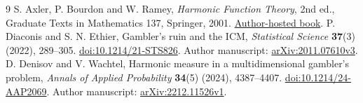 \documentclass[11pt]{article}
\begin{document}
\begin{thebibliography}{9}
S. Axler, P. Bourdon and W. Ramey,
\emph{Harmonic Function Theory}, 2nd ed., Graduate Texts in Mathematics 137,
Springer, 2001.
\href{https://www.axler.net/HFT.pdf}{Author-hosted book}.
P. Diaconis and S. N. Ethier, Gambler's ruin and the ICM,
\emph{Statistical Science} \textbf{37}(3) (2022), 289--305.
\href{https://doi.org/10.1214/21-STS826}{doi:10.1214/21-STS826}.
Author manuscript: \href{https://arxiv.org/abs/2011.07610v3}{arXiv:2011.07610v3}.
D. Denisov and V. Wachtel, Harmonic measure in a multidimensional gambler's problem,
\emph{Annals of Applied Probability} \textbf{34}(5) (2024), 4387--4407.
\href{https://doi.org/10.1214/24-AAP2069}{doi:10.1214/24-AAP2069}.
Author manuscript: \href{https://arxiv.org/abs/2212.11526v1}{arXiv:2212.11526v1}.
\end{thebibliography}
\end{document}
